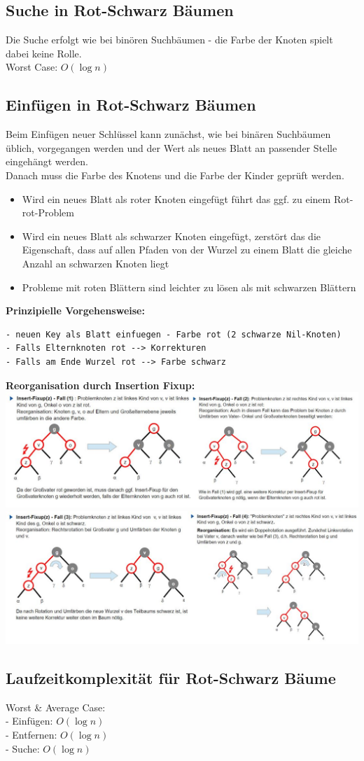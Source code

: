\documentclass{scrreprt}
\begin{document}
\subsection{Suche in Rot-Schwarz Bäumen}
Die Suche erfolgt wie bei binören Suchbäumen - die Farbe der Knoten spielt dabei keine Rolle.
\\Worst Case: $O(\log n)$
\subsection{Einfügen in Rot-Schwarz Bäumen}
Beim Einfügen neuer Schlüssel kann zunächst, wie bei binären Suchbäumen üblich, vorgegangen werden und der
Wert als neues Blatt an passender Stelle eingehängt werden.
\\Danach muss die Farbe des Knotens und die Farbe der Kinder geprüft werden.
\begin{itemize}
  \item Wird ein neues Blatt als roter Knoten eingefügt führt das ggf. zu einem Rot-rot-Problem
  \item Wird ein neues Blatt als schwarzer Knoten eingefügt, zerstört das die Eigenschaft, 
  dass auf allen Pfaden von der Wurzel zu einem Blatt die gleiche Anzahl an schwarzen Knoten liegt
  \item Probleme mit roten Blättern sind leichter zu lösen als mit schwarzen Blättern
\end{itemize}
\textbf{Prinzipielle Vorgehensweise:}
\begin{lstlisting}
- neuen Key als Blatt einfuegen - Farbe rot (2 schwarze Nil-Knoten)
- Falls Elternknoten rot --> Korrekturen 
- Falls am Ende Wurzel rot --> Farbe schwarz
\end{lstlisting}
\textbf{Reorganisation durch Insertion Fixup:}
\\\includegraphics[width=1\textwidth]{graphics/Fixup1}
\\\includegraphics[width=1\textwidth]{graphics/Fixup2}
\subsection{Laufzeitkomplexität für Rot-Schwarz Bäume}
Worst \& Average Case:
\\- Einfügen: $O(\log n)$
\\- Entfernen: $O(\log n)$
\\- Suche: $O(\log n)$
\end{document}
